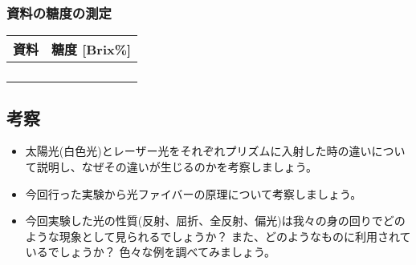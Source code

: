 \bigskip\bigskip

\subsubsection*{資料の糖度の測定}
\hspace*{-\parindent}
\begin{tabular}{|p{4cm}|p{4cm}|}
\hline
資料 & 糖度 [Brix\%] \\
\hline\hline
&\\
\hline
&\\
\hline
&\\
\hline
&\\
\hline
\end{tabular}




\subsection*{考察}

\begin{itemize}

\item 太陽光(白色光)とレーザー光をそれぞれプリズムに入射した時の違いについて説明し、なぜその違いが生じるのかを考察しましょう。

\newpage

\item 今回行った実験から光ファイバーの原理について考察しましょう。

\vspace{7cm}

\item 今回実験した光の性質(反射、屈折、全反射、偏光)は我々の身の回りでどのような現象として見られるでしょうか？ また、どのようなものに利用されているでしょうか？  色々な例を調べてみましょう。


\end{itemize}

